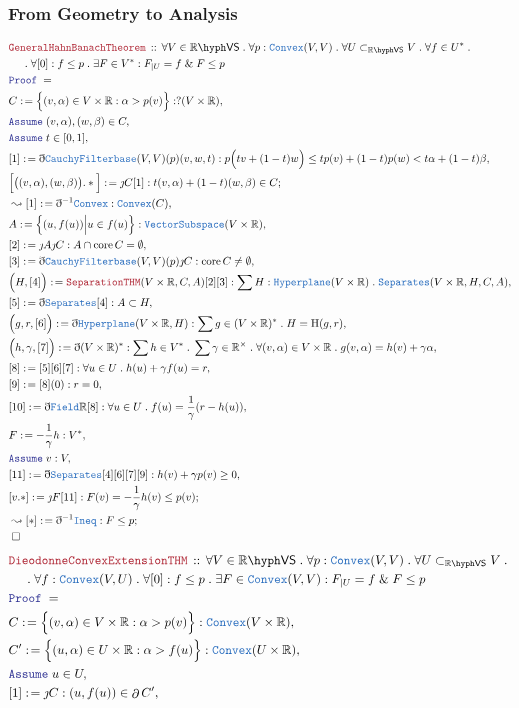 \documentclass[12pt]{scrartcl}
\newcommand{\TYPE}[1]{\textcolor{NavyBlue}{\mathtt{#1}}}
\newcommand{\LOGIC}[1]{\textcolor{Blue}{\mathtt{#1}}}
\newcommand{\THM}[1]{\textcolor{Maroon}{\mathtt{#1}}}
\renewcommand{\.}{\; . \;}
\newcommand{\de}{: \kern 0.1pc =}
\newcommand{\Theorem}[2]{& \THM{#1} \, :: \, #2 \\ & \Proof = \\ }
\newcommand{\NewLine}{\\ & \kern 1pc}
\newcommand{\Page}[1]{ \begin{align*} #1 \end{align*}   }
\newcommand{ \bd }{ \ByDef }
\renewcommand{\And}{\; \& \;}
\newcommand{\Reals}{\mathbb{R} }
\newcommand{\Say}[3]{& #1 \de #2 : #3, \\}
\newcommand{\Conclude}[3]{& #1 \de #2 : #3; \\}
\newcommand{\Derive}[3]{& \leadsto #1 \de #2 : #3, \\}
\newcommand{\DeriveConclude}[3]{& \leadsto #1 \de #2 : #3 ; \\}
\newcommand{\Assume}[2]{& \LOGIC{Assume} \; #1 : #2, \\}
\newcommand{\AssumeIn}[2]{& \LOGIC{Assume} \; #1 \in #2, \\}
\newcommand{\QED}{\; \square}
\newcommand{\EndProof}{& \QED \\}
\newcommand{\ByDef}{\eth}
\newcommand{\ByConstr}{\jmath}
\newcommand{\Proof}{\LOGIC{Proof} \; }
\DeclareMathOperator*{\boundary}{\partial}
\renewcommand{\H}{\mathrm{H}}
\newcommand{\subvec}[1]{\subset_{\VS{#1}}}%
\newcommand{\VS}[1]{#1\hyph\mathsf{VS}} %
\newcommand{\Field}{\TYPE{Field}}
\newcommand{\Convex}{\TYPE{Convex}}
\DeclareMathOperator{\core}{core}
\renewcommand{\H}{\mathrm{H}}
\newcommand{\CF}{\TYPE{CauchyFilterbase}}
\begin{document}
\subsubsection{From Geometry to Analysis}
\Page{
	\Theorem{GeneralHahnBanachTheorem}
	{
		\forall V \in \VS{\Reals} \.
		\forall p  : \Convex(V,V) \.
		\forall U \subvec{\Reals} V \.
		\forall f \in U^* \. \NewLine \.
		\forall [0] : f \le p \. 
		\exists F \in V^* : 
		F_{|U} = f \And F \le p
	}
	\Say{C}{\Big\{ (v,\alpha) \in V \times \Reals : \alpha > p(v) \Big\}}{?(V \times \Reals)}
	\AssumeIn{(v,\alpha),(w,\beta)}{C}
	\AssumeIn{t}{[0,1]}
	\Say{[1]}{\bd \CF(V,V)(p)(v,w,t)}
	{ p\Big(tv + (1-t)w \Big) \le t p(v) + (1-t)p(w) < t\alpha + (1 -t)\beta   }
	\Conclude{\Big[\big((v,\alpha),(w,\beta)\big).*\Big]}
	{ \ByConstr C [1]  }{ t(v,\alpha) + (1-t)(w,\beta) \in C}
	\Derive{[1]}{\bd^{-1} \Convex}{\TYPE{Convex}(C)}
	\Say{A}{\Big\{ (u,f(u)) \Big| u \in f(u) \Big\}}
	{
		\TYPE{VectorSubspace}(V\times\Reals)
	}
	\Say{[2]}{\ByConstr A \ByConstr C}{A \cap \core C = \emptyset}
	\Say{[3]}{\bd \CF(V,V)(p)\ByConstr C}{\core C \neq \emptyset}
	\Say{\Big(H,[4]\Big)}{\THM{SeparationTHM}(V \times \Reals,C,A)[2][3]}
	{
		\sum H : \TYPE{Hyperplane}(V\times\Reals) \. 
		\TYPE{Separates}(V\times\Reals,H,C,A)
	}
	\Say{[5]}{\bd \TYPE{Separates} [4]}{ A \subset H}
	\Say{\Big(g,r,[6]\Big)}{\bd \TYPE{Hyperplane}(V\times\Reals,H)}
	{
		\sum g \in (V \times \Reals)^* \. H = \H(g,r)
	}
	\Say{\Big(h,\gamma, [7] \Big)}{\bd (V \times \Reals)^*}
	{
		\sum h \in V^* \. \sum \gamma \in \Reals^\times \. 
		\forall (v,\alpha) \in V \times \Reals \. 
		g(v,\alpha) = h(v) + \gamma\alpha
	}
	\Say{[8]}{[5][6][7]}{\forall u \in U \. h(u) + \gamma f(u) = r}
	\Say{[9]}{[8](0)}{r = 0}
	\Say{[10]}{\bd \Field \Reals[8]}{ \forall u \in U \. f(u) = \frac{1}{\gamma} (r-h(u)) }
	\Say{F}{-\frac{1}{\gamma}h}{V^*}
	\Assume{v}{V}
	\Say{[11]}{\bd \TYPE{Separates}[4][6][7][9]}{h(v) + \gamma p(v) \ge 0}
	\Conclude{[v.*]}{\ByConstr F [11]}
	{
		F(v) = - \frac{1}{\gamma} h(v) \le p(v)
	}
	\DeriveConclude{[*]}{\bd^{-1} \TYPE{Ineq} }{ F \le p}
	\EndProof
}\Page{
	\Theorem{DieodonneConvexExtensionTHM}
	{
		\forall V \in \VS{\Reals} \.
		\forall p  : \Convex(V,V) \.
		\forall U \subvec{\Reals} V \. \NewLine \.
		\forall f : \Convex(V,U) \. 
		\forall [0] : f \le p \. 
		\exists F \in \Convex(V,V) : 
		F_{|U} = f \And F \le p
	}
	\Say{C}{\Big\{ (v,\alpha) \in V \times \Reals : \alpha > p(v) \Big\}}{\Convex(V \times \Reals)}
	\Say{C'}{\Big\{ (u,\alpha) \in U \times \Reals : \alpha > f(u) \Big\}}{\Convex(U \times \Reals)}
	\AssumeIn{u}{U}
	\Say{[1]}{\ByConstr C}{(u,f(u)) \in  \boundary C'}
}
\end{document}
